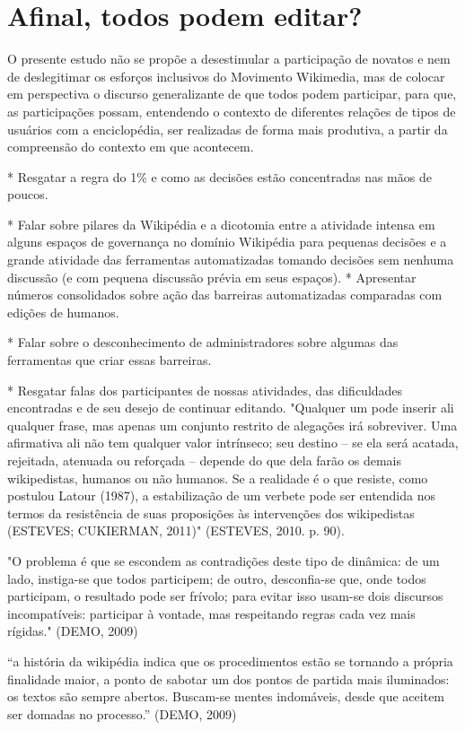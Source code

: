 \section{Afinal, todos podem editar?}

O presente estudo não se propõe a desestimular a participação de novatos e nem de deslegitimar os esforços inclusivos do Movimento Wikimedia, mas de colocar em perspectiva o discurso generalizante de que todos podem participar, para que, as participações possam, entendendo o contexto de diferentes relações de tipos de usuários com a enciclopédia, ser realizadas de forma mais produtiva, a partir da compreensão do contexto em que acontecem.


* Resgatar a regra do 1\% e como as decisões estão concentradas nas mãos de poucos.

* Falar sobre pilares da Wikipédia e a dicotomia entre a atividade intensa em alguns espaços de governança no domínio Wikipédia para pequenas decisões e a grande atividade das ferramentas automatizadas tomando decisões sem nenhuma discussão (e com pequena discussão prévia em seus espaços).
* Apresentar números consolidados sobre ação das barreiras automatizadas comparadas com edições de humanos.

* Falar sobre o desconhecimento de administradores sobre algumas das ferramentas que criar essas barreiras.

* Resgatar falas dos participantes de nossas atividades, das dificuldades encontradas e de seu desejo de continuar editando.
"Qualquer um pode inserir ali qualquer frase, mas apenas um conjunto restrito de alegações irá sobreviver. Uma afirmativa ali não tem qualquer valor intrínseco; seu destino – se ela será acatada, rejeitada, atenuada ou reforçada – depende do que dela farão os demais wikipedistas, humanos ou não humanos. Se a realidade é o que resiste, como postulou Latour (1987), a estabilização de um verbete pode ser entendida nos termos da resistência de suas proposições às intervenções dos wikipedistas (ESTEVES; CUKIERMAN, 2011)" (ESTEVES, 2010. p. 90).

"O problema é que se escondem as contradições deste tipo de dinâmica: de um lado, instiga-se que todos participem; de outro, desconfia-se que, onde todos participam, o resultado pode ser frívolo; para evitar isso usam-se dois discursos incompatíveis: participar à vontade, mas respeitando regras cada vez mais rígidas." (DEMO, 2009)

``a história da wikipédia indica que os procedimentos estão se tornando a própria finalidade maior, a ponto de sabotar um dos pontos de partida mais iluminados: os textos são sempre abertos. Buscam-se mentes indomáveis, desde que aceitem ser domadas no processo.'' (DEMO, 2009)

